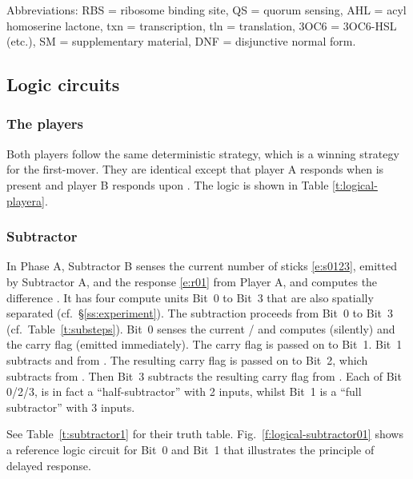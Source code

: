 \documentclass[12pt,notitlepage]{article}
\begin{document}
%
%

Abbreviations:
RBS = ribosome binding site,
QS = quorum sensing,
AHL = acyl homoserine lactone,
txn = transcription,
tln = translation,
{3OC6} = {3OC6}{-}HSL (etc.),
SM = supplementary material,
DNF = disjunctive normal form.



\subsection{Logic circuits}


\subsubsection*{The players} \label{ss:players}

Both players
follow the same deterministic strategy,
which is a winning strategy for the first-mover.
%
They are identical except
that player A responds when  is present
and player B responds upon .
%
The logic is shown in Table \ref{t:logical-playera}.


\subsubsection*{Subtractor} \label{ss:sub}


In Phase A,
Subtractor B 
senses the current number of sticks \eqref{e:s0123},
emitted by Subtractor A,
and 
the response \eqref{e:r01} from Player A,
and
computes the difference .
%
It has four compute units Bit~0 to Bit~3
that are also
spatially separated (cf.~\S\ref{ss:experiment}). 
%
The subtraction proceeds from Bit~0 to Bit~3
(cf.~Table~\ref{t:substeps}).
%
Bit~0 senses the current /
and computes  (silently)
and the carry flag  (emitted immediately).
%
The carry flag is passed on to Bit~1.
%
Bit~1 subtracts  and  from . 
%
The resulting carry flag  
is passed on to Bit~2, 
which subtracts  from .
%
Then Bit~3 subtracts the resulting carry flag
 from .
%
Each of
Bit 0/2/3,
is in fact a ``half-subtractor'' with 2 inputs,
whilst
Bit~1 is a ``full subtractor'' with 3 inputs.

%

See
Table~\ref{t:subtractor1}
for their truth table.
%
Fig.~\ref{f:logical-subtractor01}
shows a reference logic circuit 
for Bit~0 and Bit~1
that illustrates the principle of delayed response.
\end{document}
